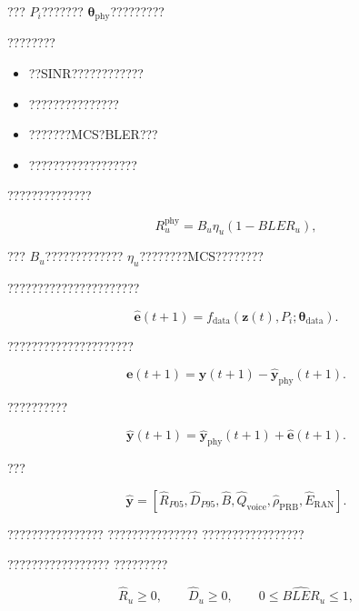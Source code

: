 ???
$P_i$???????
$\boldsymbol{\theta}_{\mathrm{phy}}$?????????

????????

\begin{itemize}
    \item ??SINR????????????
    \item ???????????????
    \item ???????MCS?BLER???
    \item ??????????????????
\end{itemize}

??????????????

\begin{equation}
R_u^{\mathrm{phy}}
=
B_u
\eta_u
\left(
1-BLER_u
\right),
\label{eq:physical_throughput_model}
\end{equation}

???
$B_u$?????????????
$\eta_u$????????MCS????????

??????????????????????

\begin{equation}
\hat{\boldsymbol{e}}(t+1)
=
f_{\mathrm{data}}
\left(
\boldsymbol{z}(t),
P_i;
\boldsymbol{\theta}_{\mathrm{data}}
\right).
\label{eq:data_driven_residual_model}
\end{equation}

?????????????????????

\begin{equation}
\boldsymbol{e}(t+1)
=
\boldsymbol{y}(t+1)
-
\hat{\boldsymbol{y}}_{\mathrm{phy}}(t+1).
\label{eq:performance_model_residual}
\end{equation}

??????????

\begin{equation}
\hat{\boldsymbol{y}}(t+1)
=
\hat{\boldsymbol{y}}_{\mathrm{phy}}(t+1)
+
\hat{\boldsymbol{e}}(t+1).
\label{eq:hybrid_twin_prediction}
\end{equation}

???

\begin{equation}
\hat{\boldsymbol{y}}
=
\left[
\hat{R}_{P05},
\hat{D}_{P95},
\hat{B},
\hat{Q}_{\mathrm{voice}},
\hat{\rho}_{\mathrm{PRB}},
\hat{E}_{\mathrm{RAN}}
\right].
\label{eq:twin_prediction_output}
\end{equation}

????????????????
???????????????
?????????????????

?????????????????
?????????

\begin{equation}
\hat{R}_u\geq0,
\qquad
\hat{D}_u\geq0,
\qquad
0\leq\widehat{BLER}_u\leq1,
\label{eq:basic_physical_constraints}
\end{equation}

